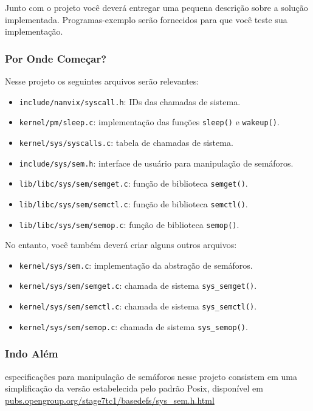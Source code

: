 \documentclass[11pt]{article}
\begin{document}
Junto com o projeto você deverá entregar uma pequena descrição sobre a solução implementada. Programas-exemplo serão fornecidos para que você teste sua implementação.

\subsubsection*{Por Onde Começar?}

Nesse projeto os seguintes arquivos serão relevantes:

\begin{itemize}
    \item \texttt{include/nanvix/syscall.h}: IDs das chamadas de sistema.
    \item \texttt{kernel/pm/sleep.c}: implementação das funções \texttt{sleep()} e \texttt{wakeup()}.
    \item \texttt{kernel/sys/syscalls.c}: tabela de chamadas de sistema.
    \item \texttt{include/sys/sem.h}: interface de usuário para manipulação de semáforos.
    \item \texttt{lib/libc/sys/sem/semget.c}: função de biblioteca \texttt{semget()}.
    \item \texttt{lib/libc/sys/sem/semctl.c}: função de biblioteca \texttt{semctl()}.
    \item \texttt{lib/libc/sys/sem/semop.c}: função de biblioteca \texttt{semop()}.
\end{itemize}

No entanto, você também deverá criar alguns outros arquivos:

\begin{itemize}
    \item \texttt{kernel/sys/sem.c}: implementação da abstração de semáforos.
    \item \texttt{kernel/sys/sem/semget.c}: chamada de sistema \texttt{sys\_semget()}.
    \item \texttt{kernel/sys/sem/semctl.c}: chamada de sistema \texttt{sys\_semctl()}.
    \item \texttt{kernel/sys/sem/semop.c}: chamada de sistema \texttt{sys\_semop()}.
\end{itemize}

\subsubsection*{Indo Além}

especificações para manipulação de semáforos nesse projeto consistem em uma simplificação da versão estabelecida pelo padrão Posix, disponível em \url{pubs.opengroup.org/stage7tc1/basedefs/sys\_sem.h.html} 
\end{document}
